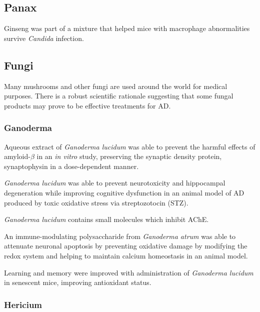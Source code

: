 \documentclass[twocolumn]{article}
\begin{document}
\subsection{Panax}

Ginseng was part of a mixture that
helped mice with macrophage abnormalities
survive \textit{Candida} infection.
\cite{akagawa1996protection}


\subsection{Fungi}

Many mushrooms and other fungi are used around the world for medical purposes.
There is a robust scientific rationale suggesting that some
fungal products may prove to be effective treatments for AD.

\subsubsection{Ganoderma}

Aqueous extract of \textit{Ganoderma lucidum}
was able to prevent the harmful effects of
amyloid-$\beta$ in an \textit{in vitro} study,
preserving the synaptic density protein, synaptophysin
in a dose-dependent manner.
\cite{lai2008antagonizing}

\textit{Ganoderma lucidum} was able to prevent neurotoxicity and
hippocampal degeneration while improving cognitive dysfunction in an animal model
of AD produced by toxic oxidative stress via streptozotocin (STZ).
\cite{zhou2012neuroprotective}

\textit{Ganoderma lucidum} contains small molecules which inhibit AChE.
\cite{lee2011selective}

An immune-modulating polysaccharide from \textit{Ganoderma atrum}
was able to attenuate neuronal apoptosis
by preventing oxidative damage by modifying the
redox system and helping to maintain calcium homeostasis
in an animal model.
\cite{li2011ganoderma}

Learning and memory were improved with
administration of \textit{Ganoderma lucidum}
in senescent mice,
improving antioxidant status.
\cite{wang2004effects}


\subsubsection{Hericium}
\end{document}
